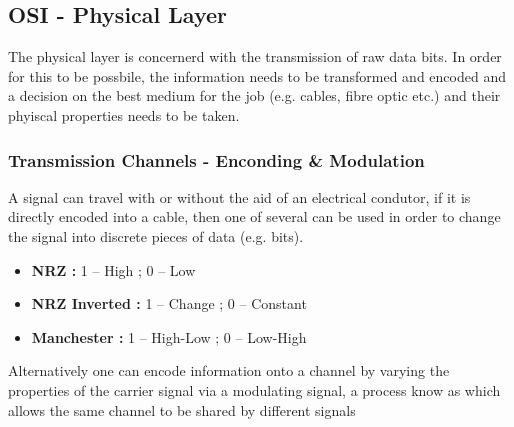 \subsection{OSI - Physical Layer}

	\par{The physical layer is concernerd with the transmission of raw data bits. In order for this to be possbile, the information needs to be transformed and encoded and a decision on the best medium for the job (e.g. cables, fibre optic etc.) and their phyiscal properties needs to be taken.}

	\subsubsection{Transmission Channels - Enconding \& Modulation}



	\par{A signal can travel with or without the aid of an electrical condutor, if it is directly encoded into a cable, then one of several  can be used in order to change the signal into discrete pieces of data (e.g. bits).}

		\begin{itemize}
			\setlength\itemsep{0.5em}
			\mymarginpar{High $\approx [3,5]v$ , and Low $\approx [0,3)$}
			\item\textbf{NRZ : }{1 -- High ; 0 -- Low}
			\item\textbf{NRZ Inverted : }{1 -- Change ; 0 -- Constant}
			\item\textbf{Manchester : }{1 -- High-Low ; 0 -- Low-High}
		\end{itemize}
		


	\par{Alternatively one can encode information onto a channel by varying the properties of the carrier signal via a modulating signal, a process know as  which allows the same channel to be shared by different signals}


